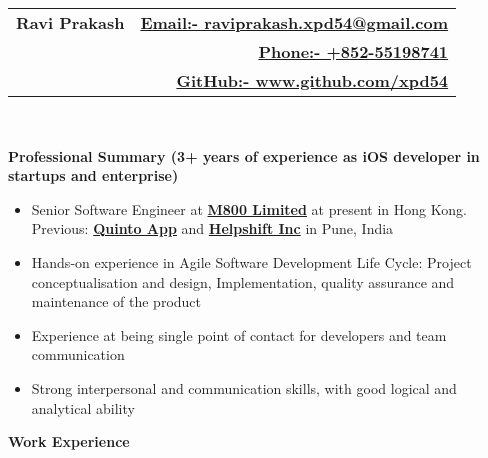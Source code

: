 \documentclass[letterpaper,11pt]{article}
\newcommand{\resitem}[1]{\item #1 \vspace{-2pt}}
\newcommand{\resheading}[1]{{\large \colorbox{mygrey}{\begin{minipage}{\textwidth}{\textbf{#1 \vphantom{p\^{E}}}}\end{minipage}}}}
\begin{document}
\newcommand{\mywebheader}{
\begin{tabular*}{7in}{l@{\extracolsep{\fill}}r}
\textbf{\Huge \bfseries Ravi Prakash} 
& \href{mailto:raviprakash.xpd54@gmail.com}{\normalsize \bfseries Email:- \mdseries raviprakash.xpd54@gmail.com}\\
 & \href{tel:+85255198741}{\normalsize \bfseries Phone:- \mdseries +852-55198741}\\
 & \href{http://www.github.com/xpd54}{\normalsize \bfseries GitHub:- \mdseries www.github.com/xpd54}\\
\end{tabular*}
\\}
\mywebheader

\resheading{\Large Professional Summary \bfseries \normalsize \newline 
(3+ years of experience as iOS developer in startups and enterprise)}
{ \footnotesize
\begin{itemize}
\resitem{Senior Software Engineer at \href{https://www.m800.com/}{\bfseries M800 Limited} at present in Hong Kong. Previous: \href{http://quintoapp.com}{\bfseries Quinto App} and \href{helpshift.com} {\bfseries  Helpshift Inc} in Pune, India}
\resitem{Hands-on experience in Agile Software Development Life Cycle: Project conceptualisation and design, Implementation,
quality assurance and maintenance of the product}
\resitem{Experience at being single point of contact for developers and team communication}
\resitem{Strong interpersonal and communication skills, with good logical and analytical ability}
\end{itemize}
} %

\resheading{Work Experience}
\end{document}
